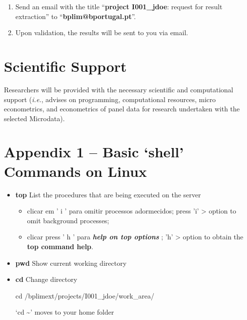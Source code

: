 \documentclass[]{book}
\begin{document}
\begin{enumerate}
\def\labelenumi{\arabic{enumi}.}
\item
  Send an email with the title
  ``\textbf{project I001\_jdoe}: request for result extraction'' to
  ``\textbf{{bplim@bportugal.pt}}''.
\item
  Upon validation, the results will be sent to you via email.
\end{enumerate}

\hypertarget{scientific-support}{%
\section{\texorpdfstring{{Scientific Support}}{Scientific Support}}\label{scientific-support}}

Researchers will be provided with the necessary scientific and
computational support (\emph{i.e.}, advises on programming, computational
resources, micro econometrics, and econometrics of panel data for
research undertaken with the selected Microdata).

\hypertarget{appendix-1-basic-shell-commands-on-linux}{%
\section{\texorpdfstring{{Appendix 1 -- Basic `shell' Commands on Linux}}{Appendix 1 -- Basic `shell' Commands on Linux}}\label{appendix-1-basic-shell-commands-on-linux}}

\begin{itemize}
\item
  \textbf{top} List the procedures that are being executed on the
  server

  \begin{itemize}
  \item
    clicar em ' i ' para omitir processos adormecidos; press 'i'
    \textgreater{} option to omit background processes;
  \item
    clicar press ' h ' para \textbf{\emph{help on top options}} ; 'h'
    \textgreater{} option to obtain the \textbf{top command help}.
  \end{itemize}
\item
  \textbf{pwd} Show current working
  directory
\item
  \textbf{cd} Change directory

  cd /bplimext/projects/I001\_jdoe/work\_area/

  `cd \textasciitilde{}' moves to your home folder
\end{itemize}
\end{document}
